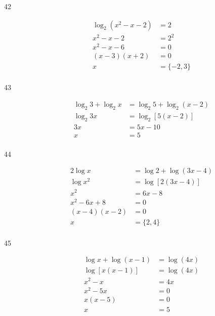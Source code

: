 \documentclass{exam}
\begin{document}
\begin{description}
      \item[42] 
        \begin{align*}
          \log_2(x^2 - x - 2) &= 2 \\
          x^2 - x - 2         &= 2^2 \\
          x^2 - x - 6         &= 0 \\
          (x - 3)(x + 2)      &= 0 \\
          x                   &= \boxed{\{ - 2, 3\}} \\
        \end{align*}

      \item[43] 
        \begin{align*}
          \log_2 3 + \log_2 x &= \log_2 5 + \log_2(x - 2) \\
          \log_2 3x           &= \log_2 [5 (x - 2)] \\
          3x                  &= 5x - 10 \\
          x                   &= \boxed{5} \\
        \end{align*}

      \item[44] 
        \begin{align*}
          2 \log x       &= \log 2 + \log(3x - 4) \\
          \log x^2       &= \log [2(3x - 4)] \\
          x^2            &= 6x - 8 \\
          x^2 - 6x + 8   &= 0 \\
          (x - 4)(x - 2) &= 0 \\
          x              &= \boxed{\{2, 4\}} \\
        \end{align*}

      \item[45] 
        \begin{align*}
          \log x + \log(x - 1) &= \log (4x) \\
          \log [x(x - 1)]      &= \log (4x) \\
          x^2 - x              &= 4x \\
          x^2 - 5x             &= 0 \\
          x(x - 5)             &= 0 \\
          x                    &= \boxed{5} \\
        \end{align*}


\end{description}
\end{document}
